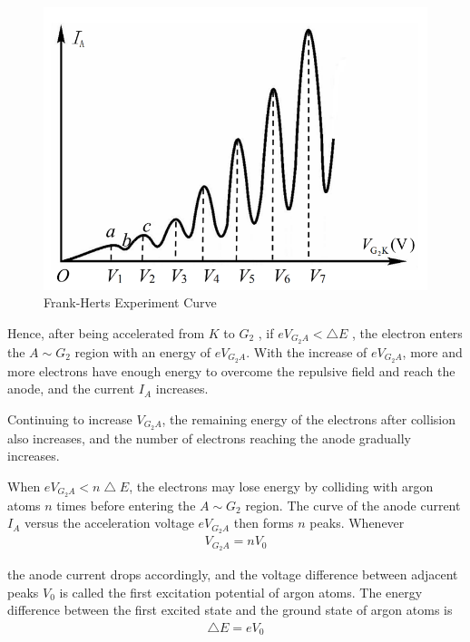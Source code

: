 \documentclass[UTF8]{article}
\begin{document}
	\begin{figure}[H]
        	\centering
        	\includegraphics[clip,scale=1,trim={0 0 0 0}]{fig/fig4.png}
            \caption{Frank-Herts Experiment Curve}
            \label{figure.4}
   \end{figure}    
   
   Hence, after being accelerated from $K$ to $G_2$ , if $eV_{G_2A}< \bigtriangleup E$ , the electron enters the $A\sim G_2$ region with an energy of $eV_{G_2A}$. With the increase of $eV_{G_2A}$, more and more electrons have enough energy to overcome the repulsive field and reach the anode, and the current $I_A$  increases.
   
   Continuing to increase $V_{G_2A}$, the remaining energy of the electrons after collision also increases, and the number of electrons reaching the anode gradually increases. 
   
   When $eV_{G_2A}< n\bigtriangleup E$, the electrons may lose energy by colliding with argon atoms $n$ times before entering the $A\sim G_2$ region. The curve of the anode current  $I_A$ versus the acceleration voltage $eV_{G_2A}$ then forms $n$ peaks. Whenever 
   \begin{eqnarray}
   V_{G_2A}=nV_0
   \end{eqnarray}
   
   the anode current drops accordingly, and the voltage difference between adjacent peaks $V_0$ is called the first excitation potential of argon atoms. The energy difference between the first excited state and the ground state of argon atoms is 
   \begin{eqnarray}
   \bigtriangleup E = eV_0
   \end{eqnarray}
   
\end{document}
